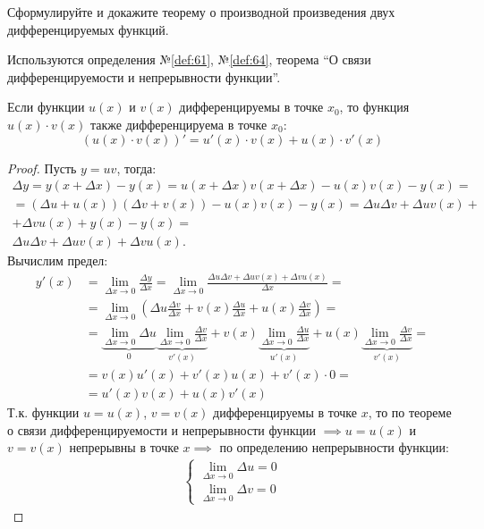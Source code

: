 \begin{question}
    Сформулируйте и докажите теорему о производной произведения двух дифференцируемых функций.
\end{question}
\begin{used}
    Используются определения №\ref{def:61}, №\ref{def:64}, теорема ``О связи дифференцируемости и непрерывности функции''.
\end{used}
\begin{theorem}
    Если функции $u(x)$ и $v(x)$ дифференцируемы в точке $x_0$, то функция $u(x) \cdot v(x)$ также дифференцируема в точке $x_0$: \[
        (u(x) \cdot v(x))' = u'(x) \cdot v(x) + u(x) \cdot v'(x)
    \]
\end{theorem}
\begin{proof}
    Пусть $y = uv$, тогда:
    \begin{gather*}
        \Delta  y = y(x + \Delta x) - y(x) = u(x + \Delta x) v(x + \Delta x) - u(x) v(x) - y(x) = \\
        = (\Delta u + u(x))(\Delta v + v(x)) - u(x) v(x) - y(x) = \Delta u \Delta v + \Delta u v(x) + \\
        + \Delta v u(x) + y(x) - y(x) = \\
        \Delta u \Delta v + \Delta u v(x) + \Delta v u(x).
    \end{gather*}
    Вычислим предел:
    \begin{align*}
        y'(x) &= \lim_{\Delta x \to 0} \frac{\Delta y}{\Delta x} 
           = \lim_{\Delta x \to 0}  \frac{ \Delta u \Delta v + \Delta  u v(x) + \Delta v u(x)}{\Delta x} = \\
          &= \lim_{\Delta x \to 0} \left( \Delta u \frac{\Delta v}{\Delta x} + v(x) \frac{\Delta u}{\Delta x} + u(x) \frac{\Delta v}{\Delta x} \right) = \\
          &= \underbrace{\lim_{\Delta x \to 0} \Delta u}_{0} \underbrace{\lim_{\Delta x \to 0} \frac{\Delta v}{\Delta x}}_{v'(x)} + v(x) \underbrace{\lim_{\Delta x \to 0} \frac{\Delta u}{\Delta x}}_{u'(x)} + u(x)\underbrace{\lim_{\Delta x \to 0} \frac{\Delta v}{\Delta x}}_{v'(x)} = \\
          &= v(x) u'(x) + v'(x) u(x) + v'(x) \cdot 0 = \\
          &= \boxed{u'(x) v(x) + u(x) v'(x)}
    \end{align*}
    Т.к. функции $u = u(x)$, $v = v(x)$ дифференцируемы в точке $x$, то по теореме о связи дифференцируемости и непрерывности функции  $\implies u = u(x)$ и $v = v(x)$ непрерывны в точке  $x \implies$ по определению непрерывности функции:
    \begin{gather*}
        \begin{cases}
            \lim_{\Delta x \to 0} \Delta u = 0 \\
            \lim_{\Delta x \to 0} \Delta v = 0
        \end{cases}
    \end{gather*}
\end{proof}
\pagebreak



